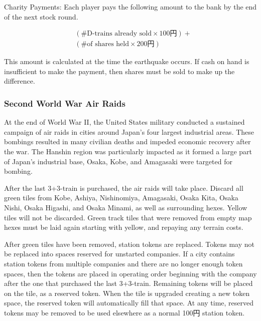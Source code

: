 \documentclass{article}
\begin{document}
\begin{CJK}{UTF8}{min}
\begin{multicols}{2}
Charity Payments: Each player pays the following amount to the bank by
the end of the next stock round.

\begin{align*}
&(\textrm{\# D-trains already sold} \times \textrm{100円}) + \\
&(\textrm{\# of shares held} \times \textrm{200円})
\end{align*}

This amount is calculated at the time the earthquake occurs. If cash
on hand is insufficient to make the payment, then shares must be sold to
make up the difference.


\subsubsection{Second World War Air Raids}

At the end of World War II, the United States military conducted a
sustained campaign of air raids in cities around Japan's four
largest industrial areas. These bombings resulted in many civilian
deaths and impeded economic recovery after the war. The Hanshin region
was particularly impacted as it formed a large part of Japan's
industrial base, Osaka, Kobe, and Amagasaki were targeted for bombing.

After the last 3+3-train is purchased, the air raids will take
place. Discard all green tiles from Kobe, Ashiya, Nishinomiya,
Amagasaki, Osaka Kita, Osaka Nishi, Osaka Higashi, and Osaka Minami,
as well as surrounding hexes. Yellow tiles will not be
discarded. Green track tiles that were removed from empty map hexes
must be laid again starting with yellow, and repaying any terrain costs.

After green tiles have been removed, station tokens are
replaced. Tokens may not be replaced into spaces reserved for
unstarted companies. If a city contains station tokens from multiple
companies and there are no longer enough token spaces, then the tokens
are placed in operating order beginning with the company after the one
that purchased the last 3+3-train. Remaining tokens will be placed on
the tile, as a reserved token. When the tile is upgraded creating a
new token space, the reserved token will automatically fill that
space. At any time, reserved tokens may be removed to be used
elsewhere as a normal 100円 station token.

\end{multicols}

\renewcommand*{\thesection}{\Alph{section}}
\renewcommand*{\theHsection}{appendix.\Alph{section}}





\end{CJK}
\end{document}
